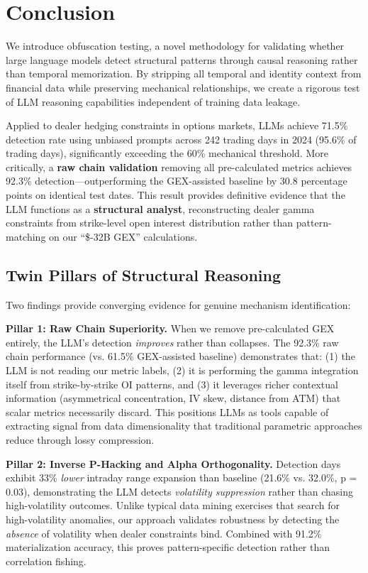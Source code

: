 \section{Conclusion}

We introduce obfuscation testing, a novel methodology for validating whether large language models detect structural patterns through causal reasoning rather than temporal memorization. By stripping all temporal and identity context from financial data while preserving mechanical relationships, we create a rigorous test of LLM reasoning capabilities independent of training data leakage.

Applied to dealer hedging constraints in options markets, LLMs achieve 71.5\% detection rate using unbiased prompts across 242 trading days in 2024 (95.6\% of trading days), significantly exceeding the 60\% mechanical threshold. More critically, a \textbf{raw chain validation} removing all pre-calculated metrics achieves 92.3\% detection—outperforming the GEX-assisted baseline by 30.8 percentage points on identical test dates. This result provides definitive evidence that the LLM functions as a \textbf{structural analyst}, reconstructing dealer gamma constraints from strike-level open interest distribution rather than pattern-matching on our ``\$-32B GEX'' calculations.

\subsection{Twin Pillars of Structural Reasoning}

Two findings provide converging evidence for genuine mechanism identification:

\textbf{Pillar 1: Raw Chain Superiority.} When we remove pre-calculated GEX entirely, the LLM's detection \textit{improves} rather than collapses. The 92.3\% raw chain performance (vs. 61.5\% GEX-assisted baseline) demonstrates that: (1) the LLM is not reading our metric labels, (2) it is performing the gamma integration itself from strike-by-strike OI patterns, and (3) it leverages richer contextual information (asymmetrical concentration, IV skew, distance from ATM) that scalar metrics necessarily discard. This positions LLMs as tools capable of extracting signal from data dimensionality that traditional parametric approaches reduce through lossy compression.

\textbf{Pillar 2: Inverse P-Hacking and Alpha Orthogonality.} Detection days exhibit 33\% \textit{lower} intraday range expansion than baseline (21.6\% vs. 32.0\%, p = 0.03), demonstrating the LLM detects \textit{volatility suppression} rather than chasing high-volatility outcomes. Unlike typical data mining exercises that search for high-volatility anomalies, our approach validates robustness by detecting the \textit{absence} of volatility when dealer constraints bind. Combined with 91.2\% materialization accuracy, this proves pattern-specific detection rather than correlation fishing.

